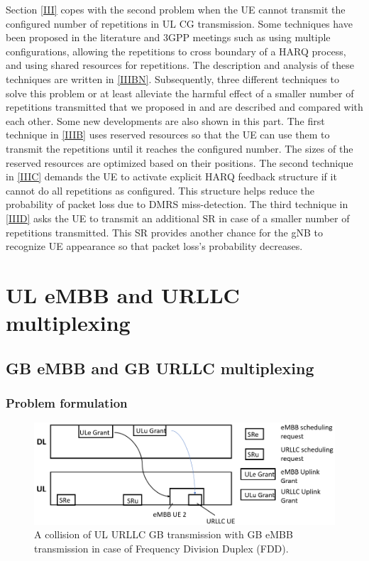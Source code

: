 \documentclass{ieeeaccess}
\begin{document}
Section \ref{III} copes with the second problem when the UE cannot transmit the configured number of repetitions in UL CG transmission. Some techniques have been proposed in the literature and 3GPP meetings such as using multiple configurations, allowing the repetitions to cross boundary of a HARQ process, and using shared resources for repetitions. The description and analysis of these techniques are written in \ref{IIIBN}. Subsequently, three different techniques to solve this problem or at least alleviate the harmful effect of a smaller number of repetitions transmitted that we proposed in \cite{b9} and \cite{ad100} are described and compared with each other. Some new developments are also shown in this part. The first technique in \ref{IIIB} uses reserved resources so that the UE can use them to transmit the repetitions until it reaches the configured number. The sizes of the reserved resources are optimized based on their positions. The second technique in \ref{IIIC} demands the UE to activate explicit HARQ feedback structure if it cannot do all repetitions as configured. This structure helps reduce the probability of packet loss due to DMRS miss-detection. The third technique in \ref{IIID} asks the UE to transmit an additional SR in case of a smaller number of repetitions transmitted. This SR provides another chance for the gNB to recognize UE appearance so that packet loss's probability decreases. 

\section{UL eMBB and URLLC multiplexing}\label{II}
\subsection{GB eMBB and GB URLLC multiplexing} \label{IIA}
\subsubsection{Problem formulation}\label{IIA1}

\begin{figure}[htbp]
\centerline{\includegraphics[scale=0.33]{fig7.PNG}}
\caption{A collision of UL URLLC GB transmission with GB eMBB transmission in case of Frequency Division Duplex (FDD).}
\label{fig7}
\vspace{-4mm}
\end{figure}
\end{document}
